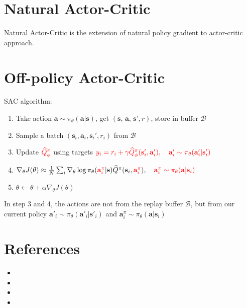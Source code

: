 \section{Natural Actor-Critic}
Natural Actor-Critic \cite{peters2005natural} is the extension of natural policy gradient \cite{kakade2001natural} to actor-critic approach. \cite{peters2008nn}

\section{Off-policy Actor-Critic}
\ac{SAC} algorithm: \cite{haarnoja2018soft}

\begin{enumerate}
	\item {}Take action $\textbf{a} \sim \pi_{\theta}(\textbf{a|s})$, get $(\textbf{s, a, s'}, r)$, store in {\color{red} buffer $\mathcal{B}$}
	\item Sample a batch $(\textbf{s}_i, \textbf{a}_i, \textbf{s}_i', r_i)$ from $\mathcal{B}$
	\item Update $\color{red}\widehat{Q}_\phi^\pi$ using targets $\color{red}y_i = r_i + \gamma \widehat{Q}_\phi^\pi(\textbf{s}'_i, \textbf{a}'_i), \quad\textbf{a}'_i \sim \pi_\theta(\textbf{a}'_i|\textbf{s}'_i)$
	\item $\nabla_\theta J(\theta) \approx \frac{1}{N}\sum_i \nabla_\theta\log\pi_{\theta}({\color{red}\textbf{a}_i^\pi}|\textbf{s}) \widehat{Q}^\pi(\textbf{s}_i, {\color{red}\textbf{a}_i^\pi}), \quad \color{red}\textbf{a}_i^\pi \sim \pi_\theta(\textbf{a} | \textbf{s}_i)$
	\item {}$\theta \leftarrow \theta + \alpha \nabla_\theta J(\theta)$
\end{enumerate}

\note In step 3 and 4, the actions are not from the replay buffer $\mathcal{B}$, but from our current policy $\textbf{a}'_i \sim \pi_\theta(\textbf{a}'_i|\textbf{s}'_i)$ and $\textbf{a}_i^\pi \sim \pi_\theta(\textbf{a} | \textbf{s}_i)$

\section{References}
\begin{itemize}
	\item {}
	\item {}
	\item {}
	\item {}
\end{itemize}